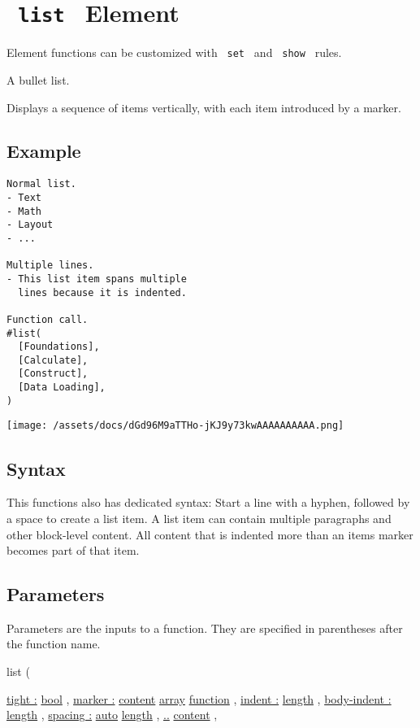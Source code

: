 \section{\texorpdfstring{\texttt{\ list\ } {{ Element
}}}{ list   Element }}\label{summary}

\label{element-tooltip}
Element functions can be customized with \texttt{\ set\ } and
\texttt{\ show\ } rules.

A bullet list.

Displays a sequence of items vertically, with each item introduced by a
marker.

\subsection{Example}\label{example}

\begin{verbatim}
Normal list.
- Text
- Math
- Layout
- ...

Multiple lines.
- This list item spans multiple
  lines because it is indented.

Function call.
#list(
  [Foundations],
  [Calculate],
  [Construct],
  [Data Loading],
)
\end{verbatim}

\texttt{[image: /assets/docs/dGd96M9aTTHo-jKJ9y73kwAAAAAAAAAA.png]}

\subsection{Syntax}\label{syntax}

This functions also has dedicated syntax: Start a line with a hyphen,
followed by a space to create a list item. A list item can contain
multiple paragraphs and other block-level content. All content that is
indented more than an item\textquotesingle s marker becomes part of that
item.

\subsection{\texorpdfstring{{ Parameters
}}{ Parameters }}\label{parameters}

\label{parameters-tooltip}
Parameters are the inputs to a function. They are specified in
parentheses after the function name.

{ list } (

{ \hyperref[parameters-tight]{tight :}
\href{/docs/reference/foundations/bool/}{bool} , } {
\hyperref[parameters-marker]{marker :}
\href{/docs/reference/foundations/content/}{content}
\href{/docs/reference/foundations/array/}{array}
\href{/docs/reference/foundations/function/}{function} , } {
\hyperref[parameters-indent]{indent :}
\href{/docs/reference/layout/length/}{length} , } {
\hyperref[parameters-body-indent]{body-indent :}
\href{/docs/reference/layout/length/}{length} , } {
\hyperref[parameters-spacing]{spacing :}
\href{/docs/reference/foundations/auto/}{auto}
\href{/docs/reference/layout/length/}{length} , } {
\hyperref[parameters-children]{..}
\href{/docs/reference/foundations/content/}{content} , }

